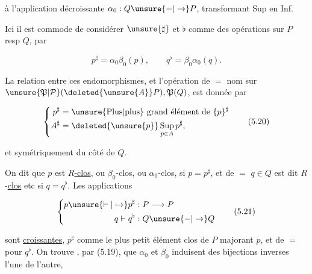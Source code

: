 
à l'application décroissante $\alpha_0:Q\unsure{-|\to}P$, transformant Sup en Inf. 

Ici il  est commode de considérer $\unsure{\sharp}$ et $\flat$ comme des opérations sur $P$ resp $Q$, par

\[
 p^\sharp=\alpha_0\beta_0(p),\qquad q^\flat=\beta_0\alpha_0(q).
 \tag*{(5.19)}
\]

La relation entre ces endomorphismes, et l'opération de $=$ nom sur $\unsure{\mathfrak P|\mathcal P}(\deleted{\unsure{A}}P),\mathfrak P(Q)$, est donnée par

\[
 \left\{\begin{aligned}
 p^\sharp&=\text{\unsure{Plus|plus} grand élément de }\{p\}^\sharp\\
 A^\sharp&=\deleted{\unsure{p}}\mathop{\mathrm{Sup}}_{p\in A}p^\sharp,
 \end{aligned}\right.
 \tag*{(5.20)}
\]

et symétriquement du côté de $Q$.

 On dit que $p$ est \uline{$R$-clos}, ou $\beta_0$-clos, ou $\alpha_0$-clos, si $p=p^\sharp$, et de $=$ $q\in Q$ est dit $R$-\uline{clos} etc si $q=q^\flat$. Les  applications

\[
 \left\{\begin{aligned}
 p\unsure{\vdash|\mapsto} p^\sharp &: P\longrightarrow P\\
 q\vdash q^\flat &: Q\unsure{-|\to}Q
 \end{aligned}\right.
 \tag*{(5.21)}
\]

sont \uline{croissantes},    $p^\sharp$ comme le plus petit élément clos de $P$ majorant $p$, et de $=$ pour $q^\flat$. On trouve , par (5.19), que $\alpha_0$ et $\beta_0$ induisent des bijections inverses l'une de l'autre,
